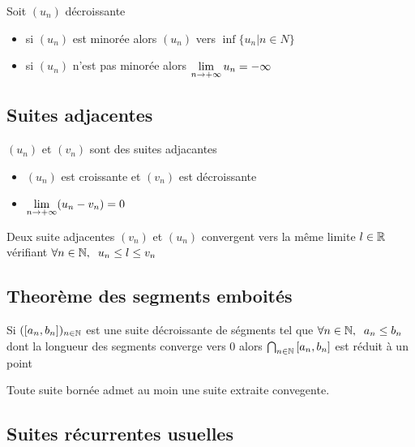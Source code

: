 \begin{cor}
Soit $(u_n)$ décroissante
\begin{itemize}
    \item si $(u_n)$ est minorée alors $(u_n)$ \cv vers $\inf\{u_n|n \in N\}$
    \item si $(u_n)$ n'est pas minorée alors $\lim\limits_{n \to +\infty} u_n = -\infty$
\end{itemize}
\end{cor}

\subsection{Suites adjacentes}

\begin{dfn}
$(u_n)$ et $(v_n)$ sont des suites adjacantes \ssi
\begin{itemize}
    \item $(u_n)$ est croissante et $(v_n)$ est décroissante
    \item $\lim\limits_{n \to +\infty} (u_n - v_n) = 0$
\end{itemize}
\end{dfn}

\begin{thm}
Deux suite adjacentes $(v_n)$ et $(u_n)$ convergent vers la même limite
$l \in \mathbb{R}$ vérifiant $\forall n \in \mathbb{N}, \;\; u_n \leq l \leq v_n$
\end{thm}

\subsection{Theorème des segments emboités}

\begin{thm}
Si $({[a_n, b_n]})_{n \in \mathbb{N}}$ est une suite décroissante de ségments
tel que $\forall n \in \mathbb{N}, \;\; a_n \leq b_n$ dont la longueur des
segments converge vers $0$ alors $\bigcap_{n \in \mathbb{N}} {[a_n, b_n]}$ est
réduit à un point
\end{thm}

\begin{thm}
Toute suite bornée admet au moin une suite extraite convegente.
\end{thm}

\subsection{Suites récurrentes usuelles}


